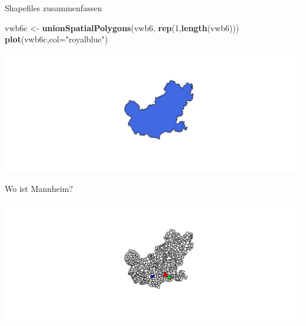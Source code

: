 \documentclass[ignorenonframetext,]{beamer}
\newenvironment{Shaded}{\begin{snugshade}}{\end{snugshade}}
\newcommand{\DataTypeTok}[1]{\textcolor[rgb]{0.13,0.29,0.53}{#1}}
\newcommand{\DecValTok}[1]{\textcolor[rgb]{0.00,0.00,0.81}{#1}}
\newcommand{\KeywordTok}[1]{\textcolor[rgb]{0.13,0.29,0.53}{\textbf{#1}}}
\newcommand{\NormalTok}[1]{#1}
\newcommand{\OperatorTok}[1]{\textcolor[rgb]{0.81,0.36,0.00}{\textbf{#1}}}
\newcommand{\StringTok}[1]{\textcolor[rgb]{0.31,0.60,0.02}{#1}}
\begin{document}
\begin{frame}[fragile]{Shapefiles zusammenfassen}
\protect\hypertarget{shapefiles-zusammenfassen}{}

\begin{Shaded}
\begin{Highlighting}[]
\NormalTok{vwb6c <-}\StringTok{ }\KeywordTok{unionSpatialPolygons}\NormalTok{(vwb6,}
              \KeywordTok{rep}\NormalTok{(}\DecValTok{1}\NormalTok{,}\KeywordTok{length}\NormalTok{(vwb6)))}
\KeywordTok{plot}\NormalTok{(vwb6c,}\DataTypeTok{col=}\StringTok{"royalblue"}\NormalTok{)}
\end{Highlighting}
\end{Shaded}

\includegraphics{shapefiles_files/figure-beamer/unnamed-chunk-13-1.pdf}

\end{frame}

\begin{frame}[fragile]{Wo ist Mannheim?}
\protect\hypertarget{wo-ist-mannheim}{}

\begin{Shaded}
\end{Shaded}

\includegraphics{shapefiles_files/figure-beamer/unnamed-chunk-14-1.pdf}

\end{frame}
\end{document}
